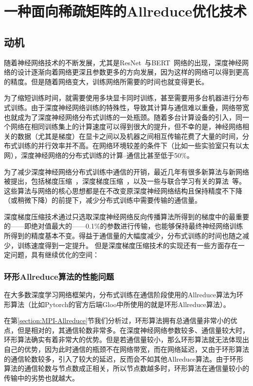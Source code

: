 \chapter{一种面向稀疏矩阵的Allreduce优化技术}
\label{chap3}

\section{动机}

随着神经网络技术的不断发展，尤其是ResNet~\cite{he2016deep}与BERT~\cite{devlin2018bert}网络的出现，深度神经网络的设计逐渐向着网络更深且参数更多的方向发展，因为这样的网络可以得到更高的精度。但是随着网络变大，训练网络所需要的时间也就变得更长。

为了缩短训练时间，就需要使用多块显卡同时训练，甚至需要用多台机器进行分布式训练。由于深度神经网络训练的特殊性，导致其计算与通信难以重叠，网络带宽也就成为了深度神经网络分布式训练的一处瓶颈。随着多台计算设备的引入，同一个网络在相同训练集上的计算速度可以得到很大的提升，但不幸的是，神经网络相关的数据（尤其是梯度）在显卡之间以及机器之间相互传输花费了大量的时间，分布式训练的并行效率并不高。在网络环境较差的条件下（比如一些实验室只有以太网），深度神经网络的分布式训练的计算--通信比甚至低于50\%。

为了减少深度神经网络分布式训练中通信的开销，最近几年有很多新算法与新网络被提出，包括梯度压缩~\cite{han2015deep}，深度梯度压缩~\cite{lin2017deep}，以及一些与联合学习有关的算法~\cite{konevcny2016federated, mcmahan2016communication}等。这些算法与网络的核心思想都是在不改变原深度神经网络结构且保持精度不下降（或稍微下降）的前提下，减少分布式训练中需要传输的通信量。

深度梯度压缩技术通过只选取深度神经网络反向传播算法所得到的梯度中的最重要的——即绝对值最大的——0.1\%的参数进行传输，也能够保持最终神经网络训练所得到的精度基本不变。得益于通信量的大幅度减少，分布式训练的时间也随之减少，训练速度得到一定提升。
但是深度梯度压缩技术的实现还有一些方面存在一定问题，具有继续优化的空间：

\subsection{环形Allreduce算法的性能问题}
  在大多数深度学习网络框架内，分布式训练在通信阶段使用的Allreduce算法为环形算法（比如Pytorch的官方后端Gloo中所使用的就是环形Allreduce算法）。
  
  在第\ref{section:MPI-Allreduce}节我们分析过，环形算法拥有总通信量非常小的优点，但是相对的，其通信轮数非常多。在深度神经网络参数较多、通信量较大时，环形算法确实有着非常大的优势。但是若通信量较小，那么环形算法就无法体现出自己的优势，因为此时通信的瓶颈不在网络带宽，而在网络延迟，又由于环形算法的通信轮数较多，引入了较大的延迟，反而会不如其他Allreduce算法。由于环形算法的通信轮数与节点数成正相关，所以节点数越多时，环形算法在通信量较小的传输中的劣势也就越大。
  
